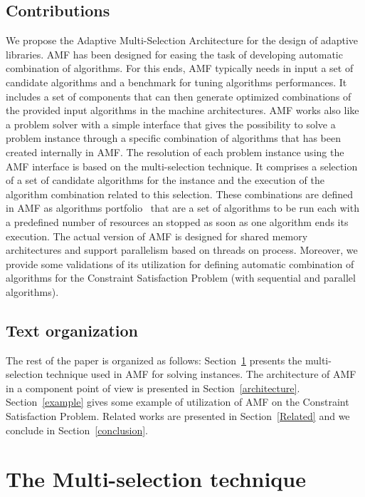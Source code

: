 \subsection{Contributions}

We propose the Adaptive Multi-Selection Architecture for the design of adaptive libraries. AMF has been  
designed for easing the task of developing automatic combination of  algorithms. For this ends, AMF typically 
needs in input a set of candidate algorithms and a benchmark for tuning algorithms performances. It includes a set of 
components that can then generate optimized combinations of the provided input algorithms in the machine architectures. 
AMF works also like a problem solver with a simple interface that gives the possibility to solve a problem 
instance through a specific combination of algorithms that has been created internally in AMF.
The resolution of each problem instance using the AMF interface is based on the multi-selection technique. 
It comprises a selection of a set of candidate algorithms for the instance and the execution of the 
algorithm combination related to this selection. These combinations are defined in AMF as algorithms 
portfolio~\cite{Huberman} that are a set of algorithms to be run each with a predefined number of resources an 
stopped as soon as one algorithm ends its execution.   
The actual version of AMF is designed for shared memory architectures and support parallelism based on 
threads on process. Moreover, we provide some validations of its utilization for defining automatic 
combination of algorithms for the Constraint Satisfaction Problem (with sequential and parallel algorithms).

\subsection{Text organization}

The rest of the paper is organized as follows:  Section~\ref{adaptiveview} presents the 
multi-selection technique used in AMF for solving instances. The architecture of AMF in a component point of 
view is presented in Section~\ref{architecture}. Section~\ref{example} gives some example 
of utilization of AMF on the Constraint Satisfaction Problem. Related works are presented in Section~\ref{Related} and 
we conclude in Section~\ref{conclusion}.



\section{The Multi-selection technique} \label{adaptiveview}

